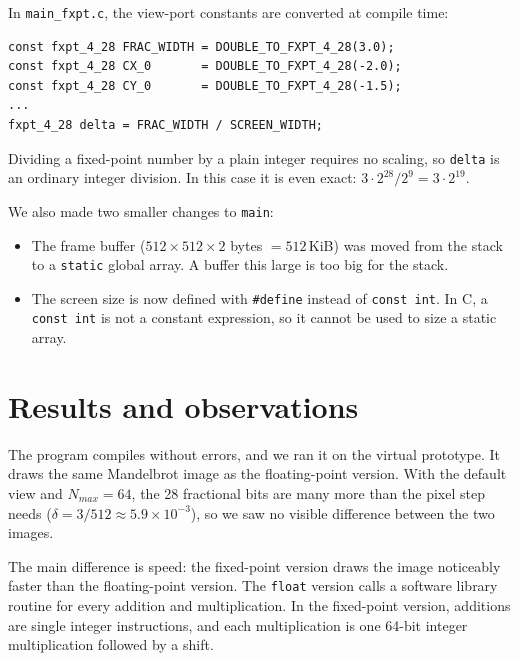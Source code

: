 \documentclass[11pt,a4paper]{article}
\begin{document}
In \texttt{main\_fxpt.c}, the view-port constants are converted at compile
time:
\begin{lstlisting}
const fxpt_4_28 FRAC_WIDTH = DOUBLE_TO_FXPT_4_28(3.0);
const fxpt_4_28 CX_0       = DOUBLE_TO_FXPT_4_28(-2.0);
const fxpt_4_28 CY_0       = DOUBLE_TO_FXPT_4_28(-1.5);
...
fxpt_4_28 delta = FRAC_WIDTH / SCREEN_WIDTH;
\end{lstlisting}
Dividing a fixed-point number by a plain integer requires no scaling, so
\texttt{delta} is an ordinary integer division. In this case it is even
exact: $3 \cdot 2^{28} / 2^9 = 3 \cdot 2^{19}$.

We also made two smaller changes to \texttt{main}:
\begin{itemize}
  \item The frame buffer ($512 \times 512 \times 2$ bytes $= 512$\,KiB) was
        moved from the stack to a \texttt{static} global array. A buffer this
        large is too big for the stack.
  \item The screen size is now defined with \texttt{\#define} instead of
        \texttt{const int}. In C, a \texttt{const int} is not a constant
        expression, so it cannot be used to size a static array.
\end{itemize}

\section{Results and observations}

The program compiles without errors, and we ran it on the virtual prototype.
It draws the same Mandelbrot image as the floating-point version. With the
default view and $N_{max} = 64$, the 28 fractional bits are many more than
the pixel step needs ($\delta = 3/512 \approx 5.9 \times 10^{-3}$), so we
saw no visible difference between the two images.

The main difference is speed: the fixed-point version draws the image
noticeably faster than the floating-point version. The \texttt{float} version
calls a software library routine for every addition and multiplication. In the
fixed-point version, additions are single integer instructions, and each
multiplication is one 64-bit integer multiplication followed by a shift.
\end{document}
